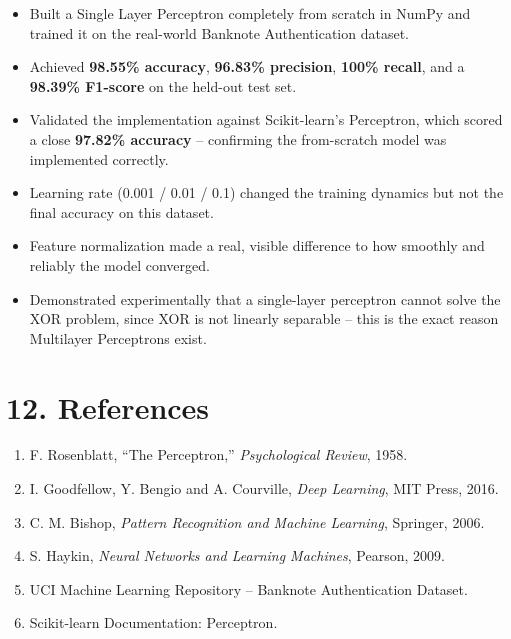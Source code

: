 \documentclass[11pt]{article}
\begin{document}
\begin{itemize}[leftmargin=*]
\item Built a Single Layer Perceptron completely from scratch in NumPy and trained it on the real-world Banknote Authentication dataset.
\item Achieved \textbf{98.55\% accuracy}, \textbf{96.83\% precision}, \textbf{100\% recall}, and a \textbf{98.39\% F1-score} on the held-out test set.
\item Validated the implementation against Scikit-learn's Perceptron, which scored a close \textbf{97.82\% accuracy} -- confirming the from-scratch model was implemented correctly.
\item Learning rate (0.001 / 0.01 / 0.1) changed the training dynamics but not the final accuracy on this dataset.
\item Feature normalization made a real, visible difference to how smoothly and reliably the model converged.
\item Demonstrated experimentally that a single-layer perceptron cannot solve the XOR problem, since XOR is not linearly separable -- this is the exact reason Multilayer Perceptrons exist.
\end{itemize}


\section*{12. References}

\begin{enumerate}
\item F. Rosenblatt, ``The Perceptron,'' \emph{Psychological Review}, 1958.
\item I. Goodfellow, Y. Bengio and A. Courville, \emph{Deep Learning}, MIT Press, 2016.
\item C. M. Bishop, \emph{Pattern Recognition and Machine Learning}, Springer, 2006.
\item S. Haykin, \emph{Neural Networks and Learning Machines}, Pearson, 2009.
\item UCI Machine Learning Repository -- Banknote Authentication Dataset.
\item Scikit-learn Documentation: Perceptron.
\end{enumerate}
\end{document}
